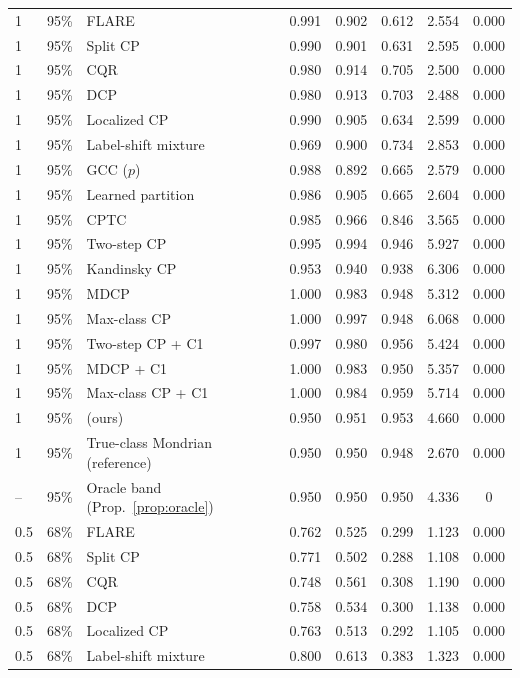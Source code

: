 \begin{longtable}{llp{4cm}ccccc}
\midrule
1 & 95\% & FLARE & 0.991 & 0.902 & 0.612 & 2.554 & 0.000 \\
1 & 95\% & Split CP & 0.990 & 0.901 & 0.631 & 2.595 & 0.000 \\
1 & 95\% & CQR & 0.980 & 0.914 & 0.705 & 2.500 & 0.000 \\
1 & 95\% & DCP & 0.980 & 0.913 & 0.703 & 2.488 & 0.000 \\
1 & 95\% & Localized CP & 0.990 & 0.905 & 0.634 & 2.599 & 0.000 \\
1 & 95\% & Label-shift mixture & 0.969 & 0.900 & 0.734 & 2.853 & 0.000 \\
1 & 95\% & GCC ($p$) & 0.988 & 0.892 & 0.665 & 2.579 & 0.000 \\
1 & 95\% & Learned partition & 0.986 & 0.905 & 0.665 & 2.604 & 0.000 \\
1 & 95\% & CPTC & 0.985 & 0.966 & 0.846 & 3.565 & 0.000 \\
1 & 95\% & Two-step CP & 0.995 & 0.994 & 0.946 & 5.927 & 0.000 \\
1 & 95\% & Kandinsky CP & 0.953 & 0.940 & 0.938 & 6.306 & 0.000 \\
1 & 95\% & MDCP & 1.000 & 0.983 & 0.948 & 5.312 & 0.000 \\
1 & 95\% & Max-class CP & 1.000 & 0.997 & 0.948 & 6.068 & 0.000 \\
1 & 95\% & Two-step CP + C1 & 0.997 & 0.980 & 0.956 & 5.424 & 0.000 \\
1 & 95\% & MDCP + C1 & 1.000 & 0.983 & 0.950 & 5.357 & 0.000 \\
1 & 95\% & Max-class CP + C1 & 1.000 & 0.984 & 0.959 & 5.714 & 0.000 \\
1 & 95\% & \gamut{} (ours) & 0.950 & 0.951 & 0.953 & 4.660 & 0.000 \\
1 & 95\% & True-class Mondrian (reference) & 0.950 & 0.950 & 0.948 & 2.670 & 0.000 \\
-- & 95\% & Oracle band (Prop.~\ref{prop:oracle}) & 0.950 & 0.950 & 0.950 & 4.336 & 0 \\
\midrule
0.5 & 68\% & FLARE & 0.762 & 0.525 & 0.299 & 1.123 & 0.000 \\
0.5 & 68\% & Split CP & 0.771 & 0.502 & 0.288 & 1.108 & 0.000 \\
0.5 & 68\% & CQR & 0.748 & 0.561 & 0.308 & 1.190 & 0.000 \\
0.5 & 68\% & DCP & 0.758 & 0.534 & 0.300 & 1.138 & 0.000 \\
0.5 & 68\% & Localized CP & 0.763 & 0.513 & 0.292 & 1.105 & 0.000 \\
0.5 & 68\% & Label-shift mixture & 0.800 & 0.613 & 0.383 & 1.323 & 0.000 \\

\end{longtable}

